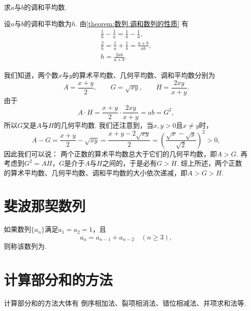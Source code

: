 \begin{example}
求\(a\)与\(b\)的调和平均数.
\begin{solution}
设\(a\)与\(b\)的调和平均数为\(h\).
由\cref{theorem:数列.调和数列的性质} 有\begin{gather*}
    \frac{1}{h} - \frac{1}{a}
    = \frac{1}{b} - \frac{1}{h}, \\
    \frac{2}{h} = \frac{1}{a} + \frac{1}{b}
    = \frac{a+b}{ab}, \\
    h = \frac{2ab}{a+b}.
\end{gather*}
\end{solution}
\end{example}

我们知道，两个数\(x\)与\(y\)的算术平均数、几何平均数、调和平均数分别为\begin{equation*}
    A = \frac{x+y}{2}, \qquad
    G = \sqrt{xy}, \qquad
    H = \frac{2xy}{x+y}.
\end{equation*}
由于\begin{equation*}
    A \cdot H = \frac{x+y}{2} \cdot \frac{2xy}{x+y}
    = ab = G^2,
\end{equation*}
所以\(G\)又是\(A\)与\(H\)的几何平均数.
我们还注意到，当\(x,y>0\)且\(x \neq y\)时，\begin{equation*}
    A - G = \frac{x+y}{2} - \sqrt{xy}
    = \frac{x+y-2\sqrt{xy}}{2}
    = \left(\frac{\sqrt{x}-\sqrt{y}}{\sqrt{2}}\right)^2
    > 0,
\end{equation*}
因此我们可以说：
两个正数的算术平均数总大于它们的几何平均数，即\(A > G\).
再考虑到\(G^2 = A H\)，\(G\)是介于\(A\)与\(H\)之间的，于是必有\(G > H\).
综上所述，两个正数的算术平均数、几何平均数、调和平均数的大小依次递减，即\(A > G > H\).

\section{斐波那契数列}
如果数列\(\{a_n\}\)满足\(a_1=a_2=1\)，且\begin{equation*}
a_n = a_{n-1} + a_{n-2} \quad(n\geq3),
\end{equation*}则称该数列为.

\section{计算部分和的方法}
计算部分和的方法大体有
倒序相加法、裂项相消法、错位相减法、并项求和法等.

